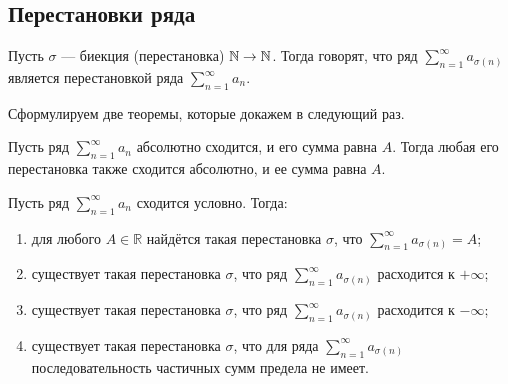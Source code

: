 \documentclass[a4paper, 12pt]{article}
\begin{document}
	\subsection{Перестановки ряда}
	\begin{Def}
		Пусть $\sigma$ --- биекция (перестановка) $\mathbb{N} \to \mathbb{N}$. Тогда говорят, что ряд $\sum\limits_{n=1}^{\infty}a_{\sigma(n)}$ является перестановкой ряда $\sum\limits_{n=1}^{\infty}a_n$.
	\end{Def}
	Сформулируем две теоремы, которые докажем в следующий раз.
	\begin{Theorem}[Коши]
		Пусть ряд $\sum\limits_{n=1}^{\infty}a_n$ абсолютно сходится, и его сумма равна $A$. Тогда любая его перестановка также сходится абсолютно, и ее сумма равна $A$.
	\end{Theorem}
	\begin{Theorem}[Римана]
		Пусть ряд $\sum\limits_{n=1}^{\infty}a_n$ сходится условно. Тогда:
		\begin{enumerate}
			\item для любого $A \in \mathbb{R}$ найдётся такая перестановка $\sigma$, что $\sum\limits_{n=1}^{\infty}a_{\sigma(n)} = A $;
			\item существует такая перестановка $\sigma$, что ряд $\sum\limits_{n=1}^{\infty}a_{\sigma(n)}$ расходится к $+\infty$;
			\item существует такая перестановка $\sigma$, что ряд $\sum\limits_{n=1}^{\infty}a_{\sigma(n)}$ расходится к $-\infty$;
			\item существует такая перестановка $\sigma$, что для ряда $\sum\limits_{n=1}^{\infty}a_{\sigma(n)}$ последовательность частичных сумм предела не имеет.
		\end{enumerate}
	\end{Theorem}
\end{document}
